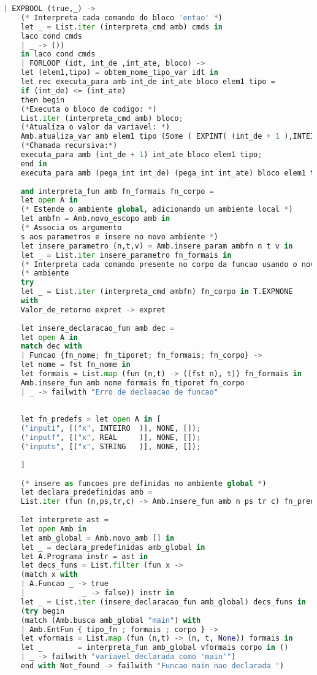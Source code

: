 \documentclass[hidelinks,12pt]{article}
\begin{document}
\begin{appendices}
\begin{lstlisting}[caption=interprete.mll, language=python]
	| EXPBOOL (true,_) ->
	(* Interpreta cada comando do bloco 'entao' *)
	let _ = List.iter (interpreta_cmd amb) cmds in 
	laco cond cmds
	| _ -> ())
	in laco cond cmds
	| FORLOOP (idt, int_de ,int_ate, bloco) ->
	let (elem1,tipo) = obtem_nome_tipo_var idt in
	let rec executa_para amb int_de int_ate bloco elem1 tipo =
	if (int_de) <= (int_ate) 
	then begin
	(*Executa o bloco de codigo: *)
	List.iter (interpreta_cmd amb) bloco;
	(*Atualiza o valor da variavel: *)
	Amb.atualiza_var amb elem1 tipo (Some ( EXPINT( (int_de + 1 ),INTEIRO) ) );
	(*Chamada recursiva:*)
	executa_para amb (int_de + 1) int_ate bloco elem1 tipo;
	end in
	executa_para amb (pega_int int_de) (pega_int int_ate) bloco elem1 tipo 
	
	and interpreta_fun amb fn_formais fn_corpo =
	let open A in
	(* Estende o ambiente global, adicionando um ambiente local *)
	let ambfn = Amb.novo_escopo amb in
	(* Associa os argumento
	s aos parametros e insere no novo ambiente *)
	let insere_parametro (n,t,v) = Amb.insere_param ambfn n t v in
	let _ = List.iter insere_parametro fn_formais in
	(* Interpreta cada comando presente no corpo da funcao usando o novo *)
	(* ambiente                                                          *)
	try
	let _ = List.iter (interpreta_cmd ambfn) fn_corpo in T.EXPNONE
	with
	Valor_de_retorno expret -> expret
	
	let insere_declaracao_fun amb dec =
	let open A in
	match dec with
	| Funcao {fn_nome; fn_tiporet; fn_formais; fn_corpo} ->
	let nome = fst fn_nome in
	let formais = List.map (fun (n,t) -> ((fst n), t)) fn_formais in
	Amb.insere_fun amb nome formais fn_tiporet fn_corpo
	| _ -> failwith "Erro de declaacao de funcao"
	
	
	let fn_predefs = let open A in [
	("inputi", [("x", INTEIRO  )], NONE, []);
	("inputf", [("x", REAL     )], NONE, []);
	("inputs", [("x", STRING   )], NONE, []);
	
	]
	
	(* insere as funcoes pre definidas no ambiente global *)
	let declara_predefinidas amb =
	List.iter (fun (n,ps,tr,c) -> Amb.insere_fun amb n ps tr c) fn_predefs
	
	let interprete ast =
	let open Amb in
	let amb_global = Amb.novo_amb [] in
	let _ = declara_predefinidas amb_global in
	let A.Programa instr = ast in
	let decs_funs = List.filter (fun x -> 
	(match x with
	| A.Funcao _ -> true
	|             _ -> false)) instr in
	let _ = List.iter (insere_declaracao_fun amb_global) decs_funs in
	(try begin
	(match (Amb.busca amb_global "main") with
	| Amb.EntFun { tipo_fn ; formais ; corpo } ->
	let vformais = List.map (fun (n,t) -> (n, t, None)) formais in
	let _        = interpreta_fun amb_global vformais corpo in ()
	| _ -> failwith "variavel declarada como 'main'")
	end with Not_found -> failwith "Funcao main nao declarada ")
	

\end{lstlisting}
\end{appendices}
\end{document}
